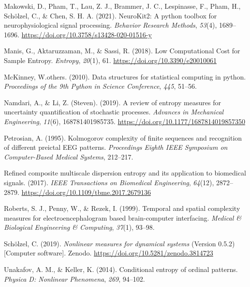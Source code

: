 \documentclass[
  man]{apa6}
\newlength{\cslhangindent}
\newlength{\cslentryspacingunit} %
\newenvironment{CSLReferences}[2] %
 {%
  \setlength{\parindent}{0pt}
  \ifodd #1
  \let\oldpar\par
  \def\par{\hangindent=\cslhangindent\oldpar}
  \fi
  \setlength{\parskip}{#2\cslentryspacingunit}
 }%
 {}
\begin{document}
\begin{CSLReferences}{1}{0}
\leavevmode{}%
Makowski, D., Pham, T., Lau, Z. J., Brammer, J. C., Lespinasse, F., Pham, H., Schölzel, C., \& Chen, S. H. A. (2021). {NeuroKit}2: A python toolbox for neurophysiological signal processing. \emph{Behavior Research Methods}, \emph{53}(4), 1689--1696. \url{https://doi.org/10.3758/s13428-020-01516-y}

\leavevmode{}%
Manis, G., Aktaruzzaman, M., \& Sassi, R. (2018). Low Computational Cost for Sample Entropy. \emph{Entropy}, \emph{20}(1), 61. \url{https://doi.org/10.3390/e20010061}

\leavevmode{}%
McKinney, W.others. (2010). Data structures for statistical computing in python. \emph{Proceedings of the 9th Python in Science Conference}, \emph{445}, 51--56.

\leavevmode{}%
Namdari, A., \& Li, Z. (Steven). (2019). A review of entropy measures for uncertainty quantification of stochastic processes. \emph{Advances in Mechanical Engineering}, \emph{11}(6), 168781401985735. \url{https://doi.org/10.1177/1687814019857350}

\leavevmode{}%
Petrosian, A. (1995). Kolmogorov complexity of finite sequences and recognition of different preictal EEG patterns. \emph{Proceedings Eighth IEEE Symposium on Computer-Based Medical Systems}, 212--217.

\leavevmode{}%
Refined composite multiscale dispersion entropy and its application to biomedical signals. (2017). \emph{IEEE Transactions on Biomedical Engineering}, \emph{64}(12), 2872--2879. \url{https://doi.org/10.1109/tbme.2017.2679136}

\leavevmode{}%
Roberts, S. J., Penny, W., \& Rezek, I. (1999). Temporal and spatial complexity measures for electroencephalogram based brain-computer interfacing. \emph{Medical \& Biological Engineering \& Computing}, \emph{37}(1), 93--98.

\leavevmode{}%
Schölzel, C. (2019). \emph{Nonlinear measures for dynamical systems} (Version 0.5.2) {[}Computer software{]}. Zenodo. \url{https://doi.org/10.5281/zenodo.3814723}

\leavevmode{}%
Unakafov, A. M., \& Keller, K. (2014). Conditional entropy of ordinal patterns. \emph{Physica D: Nonlinear Phenomena}, \emph{269}, 94--102.


\end{CSLReferences}
\end{document}
